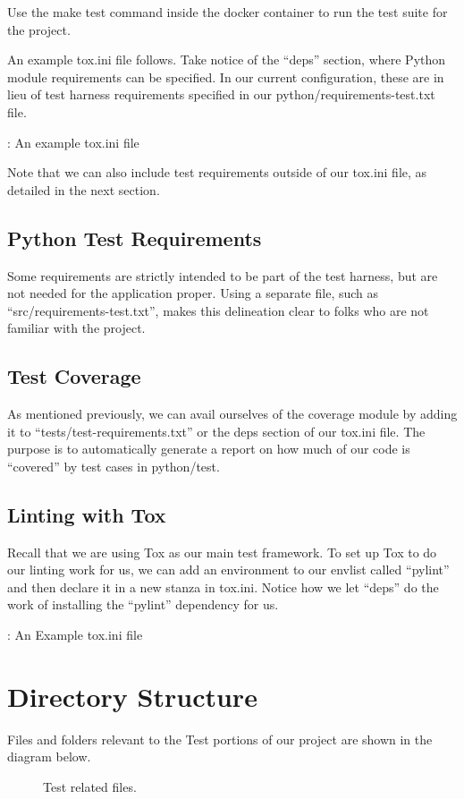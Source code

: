 \justifying
Use the make test command inside the docker container to run the test suite for the project.

\justifying
An example tox.ini file follows. Take notice of the ``deps'' section,
where Python module requirements can be specified. In our current configuration,
these are in lieu of test harness requirements specified in our
python/requirements-test.txt file.

\begin{mybox}{\thetcbcounter: An example tox.ini file}
	
\end{mybox}

\justifying
Note that we can also include test requirements outside of our tox.ini file, as detailed in the next section.

\subsection{Python Test Requirements}

\justifying
Some requirements are strictly intended to be part of the test harness, but are not needed for the application proper. Using a separate file, such as
``src/requirements-test.txt'', makes this delineation clear to folks who are not familiar with the project.

\subsection{Test Coverage}

\justifying
As mentioned previously, we can avail ourselves of the coverage module by adding it to ``tests/test-requirements.txt'' or
the deps section of our tox.ini file. The purpose is to automatically generate a report on how much of our code
is ``covered'' by test cases in python/test.

\subsection{Linting with Tox}

Recall that we are using Tox as our main test framework. To set up Tox to do our linting work for us, we can add an environment to our envlist
called ``pylint'' and then declare it in a new stanza in tox.ini. Notice how we let ``deps'' do the work of installing the ``pylint'' dependency for
us.

\begin{mybox}{\thetcbcounter: An Example tox.ini file}
	
\end{mybox}

\section{Directory Structure}
\justifying
Files and folders relevant to the Test portions of our project are shown in the diagram below.

\begin{figure}[!htb]
	\centering
	
	\caption{Test related files.}
	\label{testfiles}
\end{figure}
